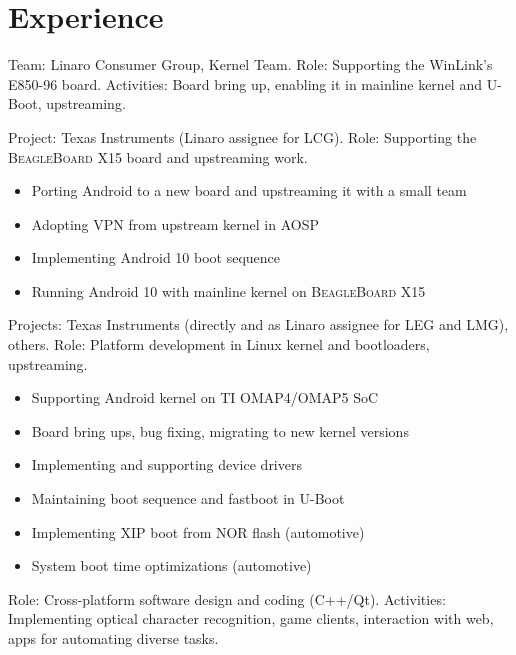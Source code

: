 \documentclass[12pt,letterpaper,sans]{moderncv}
\begin{document}
\section{Experience}
  {Team: Linaro Consumer Group, Kernel Team. \newline{}
   Role: Supporting the WinLink’s \textsc{E850-96} board. \newline{}
   Activities: Board bring up, enabling it in mainline kernel and U-Boot,
   upstreaming.}
  {Project: Texas Instruments (Linaro assignee for LCG). \newline{}
   Role: Supporting the \textsc{BeagleBoard X15} board and upstreaming work.
   \begin{itemize}
     \item Porting Android to a new board and upstreaming it with a small team
     \item Adopting VPN from upstream kernel in AOSP
     \item Implementing Android 10 boot sequence
     \item Running Android 10 with mainline kernel on \textsc{BeagleBoard X15}
   \end{itemize}}
  {Projects: Texas Instruments (directly and as Linaro assignee for LEG and
   LMG), others. \newline{}
   Role: Platform development in Linux kernel and bootloaders, upstreaming.
   \begin{itemize}
     \item Supporting Android kernel on TI OMAP4/OMAP5 SoC
     \item Board bring ups, bug fixing, migrating to new kernel versions
     \item Implementing and supporting device drivers
     \item Maintaining boot sequence and fastboot in U-Boot
     \item Implementing XIP boot from NOR flash (automotive)
     \item System boot time optimizations (automotive)
   \end{itemize}
  }
  {Role: Cross-platform software design and coding (C++/Qt). \newline{}
   Activities: Implementing optical character recognition, game clients,
   interaction with web, apps for automating diverse tasks.}
\end{document}
